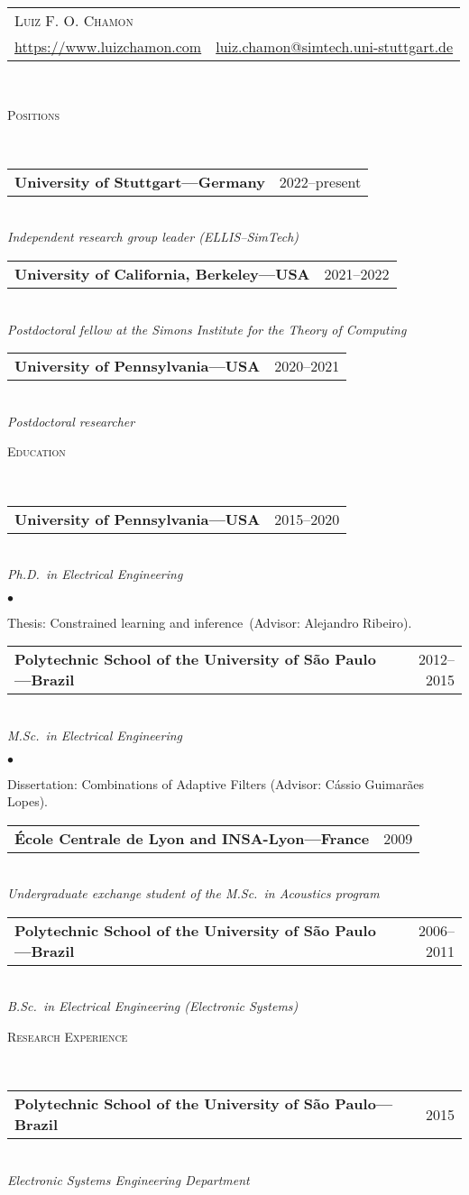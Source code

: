 \documentclass[a4paper,11pt]{article}
\makeatletter
\newcommand{\CVheader}[4]{
	\begin{tabular*}{\textwidth}{lr}
		\multicolumn{2}{l}{{\Huge \textsc{#1}} \vspace{1mm}}
		\\
		\begin{minipage}{0.5\textwidth}
			\href{#3}{#4}
		\end{minipage}
		&
		\begin{minipage}{0.5\textwidth}
			\flushright \href{mailto:#2}{#2}
		\end{minipage}
		\\
	\end{tabular*} \\ \vspace{1mm}
}
\newcommand{\CVheading}[1]{
	\vspace{10pt}
	{ \large
	\begin{minipage}{\textwidth}
		\textsc{#1 \vphantom{p\^{E}}}
	\end{minipage} } \\
	\vspace{5pt}
}
\newcommand{\CVsubheading}[2]{
	\begin{tabular*}{\textwidth}{l@{\extracolsep{\fill}}r}
		\textbf{#1} & #2 \\
	\end{tabular*} \\
}
\newcommand{\CVlist}{
	\begin{list}{$\bullet$}{
	\setlength{\itemsep}{0pt}
	\setlength{\parsep}{1pt}
	\setlength{\topsep}{1pt}
	\setlength{\partopsep}{0pt}
	\setlength{\leftmargin}{24pt}
	\setlength{\labelwidth}{1em} }
}
\newcommand{\CVlistend}{
	\end{list}
	\vspace{3pt}
}
\makeatother
\begin{document}
\CVheader%
{Luiz F. O. Chamon}%
{luiz.chamon@simtech.uni-stuttgart.de}%
{https://www.luizchamon.com}{https://www.luizchamon.com}




\CVheading{Positions}

\CVsubheading{University of Stuttgart---Germany}{2022--present}
\textit{Independent research group leader (ELLIS--SimTech)}
\vspace{3pt}


\CVsubheading{University of California, Berkeley---USA}{2021--2022}
\textit{Postdoctoral fellow at the Simons Institute for the Theory of Computing}
\vspace{3pt}

\CVsubheading{University of Pennsylvania---USA}{2020--2021}
\textit{Postdoctoral researcher}
\vspace{3pt}


\CVheading{Education}

\CVsubheading{University of Pennsylvania---USA}{2015--2020}
\textit{Ph.D.\ in Electrical Engineering}

	\CVlist

	\item Thesis: Constrained learning and inference~(Advisor: Alejandro Ribeiro).

	\CVlistend



\CVsubheading{Polytechnic School of the University of São Paulo---Brazil}{2012--2015}
\textit{M.Sc.\ in Electrical Engineering}

	\CVlist

	\item Dissertation: Combinations of Adaptive Filters (Advisor: C\'{a}ssio Guimar\~{a}es Lopes).

	\CVlistend


\CVsubheading{École Centrale de Lyon {\normalfont and} INSA-Lyon---France}{2009}
\textit{Undergraduate exchange student of the M.Sc.\ in Acoustics program}
\vspace{3pt}


\CVsubheading{Polytechnic School of the University of São Paulo---Brazil}{2006--2011}
\textit{B.Sc.\ in Electrical Engineering (Electronic Systems)}
\vspace{3pt}




\CVheading{Research Experience}


\CVsubheading{Polytechnic School of the University of São Paulo---Brazil}{2015}
\textit{Electronic Systems Engineering Department}
\end{document}
